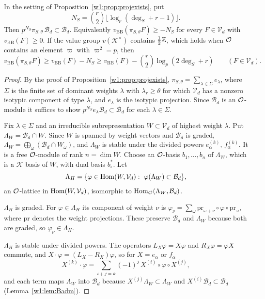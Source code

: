 \begin{theorem}\label{w1:thm:B7}
In the setting of Proposition~\ref{w1:prop:projexists}, put
\[
N_S=\binom r2\big\lfloor\log_p(\deg_S+r-1)\big\rfloor .
\]
Then $p^{N_S}\pi_{S,\theta}\,\mathcal B_d\subset\mathcal B_d$. Equivalently $v_{\mathrm{BB}}(\pi_{S,\theta}F)\ge-N_S$ for every $F\in\mathcal V_d$ with $v_{\mathrm{BB}}(F)\ge0$. If the value group $v(\mathcal K^\times)$ contains $\frac12\mathbb Z$, which holds when $\mathcal O$ contains an element $\varpi$ with $\varpi^2=p$, then
\[
v_{\mathrm{BB}}(\pi_{S,\theta}F)\ge v_{\mathrm{BB}}(F)-N_S\ge v_{\mathrm{BB}}(F)-\binom r2\log_p(2\deg_S+r)\qquad(F\in\mathcal V_d).
\]
\end{theorem}

\begin{proof}
By the proof of Proposition~\ref{w1:prop:projexists}, $\pi_{S,\theta}=\sum_{\lambda\in\Sigma}e_\lambda$, where $\Sigma$ is the finite set of dominant weights $\lambda$ with $\lambda_r\ge\theta$ for which $\mathcal V_d$ has a nonzero isotypic component of type $\lambda$, and $e_\lambda$ is the isotypic projection. Since $\mathcal B_d$ is an $\mathcal O$-module it suffices to show $p^{N_S}e_\lambda\mathcal B_d\subset\mathcal B_d$ for each $\lambda\in\Sigma$.

Fix $\lambda\in\Sigma$ and an irreducible subrepresentation $W\subset\mathcal V_d$ of highest weight $\lambda$. Put $\Lambda_W=\mathcal B_d\cap W$. Since $W$ is spanned by weight vectors and $\mathcal B_d$ is graded, $\Lambda_W=\bigoplus_\omega(\mathcal B_d\cap W_\omega)$, and $\Lambda_W$ is stable under the divided powers $e_\alpha^{(k)}$, $f_\alpha^{(k)}$. It is a free $\mathcal O$-module of rank $n=\dim W$. Choose an $\mathcal O$-basis $b_1,\dots,b_n$ of $\Lambda_W$, which is a $\mathcal K$-basis of $W$, with dual basis $b_i^*$. Let
\[
\Lambda_H=\{\varphi\in\operatorname{Hom}(W,\mathcal V_d):\ \varphi(\Lambda_W)\subset\mathcal B_d\},
\]
an $\mathcal O$-lattice in $\operatorname{Hom}(W,\mathcal V_d)$, isomorphic to $\operatorname{Hom}_\mathcal O(\Lambda_W,\mathcal B_d)$.

$\Lambda_H$ is graded. For $\varphi\in\Lambda_H$ its component of weight $\nu$ is $\varphi_\nu=\sum_\omega\mathrm{pr}_{\omega+\nu}\circ\varphi\circ\mathrm{pr}_\omega$, where $\mathrm{pr}$ denotes the weight projections. These preserve $\mathcal B_d$ and $\Lambda_W$ because both are graded, so $\varphi_\nu\in\Lambda_H$.

$\Lambda_H$ is stable under divided powers. The operators $L_X\varphi=X\varphi$ and $R_X\varphi=\varphi X$ commute, and $X\cdot\varphi=(L_X-R_X)\varphi$, so for $X=e_\alpha$ or $f_\alpha$
\[
X^{(k)}\cdot\varphi=\sum_{i+j=k}(-1)^j\,X^{(i)}\circ\varphi\circ X^{(j)} ,
\]
and each term maps $\Lambda_W$ into $\mathcal B_d$ because $X^{(j)}\Lambda_W\subset\Lambda_W$ and $X^{(i)}\mathcal B_d\subset\mathcal B_d$ (Lemma~\ref{w1:lem:Badm}).


\end{proof}
